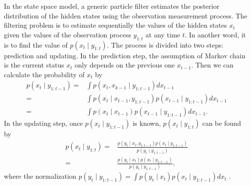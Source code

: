 In the state space model, a generic particle filter estimates the posterior distribution of the hidden states using the observation measurement process. The filtering problem is to estimate sequentially the values of the hidden states $x_t$ given the values of the observation process $y_{1:t}$ at any time $t$. In another word, it is to find the value of $p(x_t  \mid  y_{1:t})$. The process is divided into two steps: prediction and updating. In the prediction step, the assumption of Markov chain is the current status $x_t $ only depends on the previous one $x_{t-1}$. Then we can calculate the probability of $x_t$ by 
\begin{align*}
p(x_t \mid y_{1:t-1})=&\int p(x_t ,x_{k-1}\mid y_{1:t-1}) dx_{t-1}\\
=&\int p(x_t \mid x_{t-1},y_{1:t-1}) p(x_{t-1}\mid y_{1:t-1})dx_{t-1}\\
=&\int p(x_t \mid x_{t-1}) p(x_{t-1}\mid y_{1:t-1})dx_{t-1}.
\end{align*}
In the updating step, once $p(x_t \mid y_{1:t-1})$ is known, $p(x_t \mid y_{1:t})$ can be found by
\begin{align*}
p(x_t \mid y_{1:t})=&\frac{p(y_t \mid x_t ,y_{1:t-1})p(x_{t}\mid y_{1:t-1})}{p(y_t \mid  y_{1:t-1})} \\
=&\frac{p(y_t \mid x_t )p(x_{t}\mid y_{1:t-1})}{p(y_t \mid  y_{1:t-1})},
\end{align*}
where the normalization $p(y_t \mid  y_{1:t-1})=\int p(y_t \mid x_t )p(x_t \mid  y_{1:t-1}) dx_t $ \cite{arulampalam2002tutorial}.

